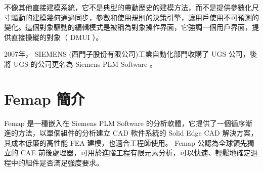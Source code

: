 不像其他直接建模系統，它不是典型的帶動歷史的建模方法，而不是提供參數化尺寸驅動的建模幾何通過同步，參數和使用規則的決策引擎，讓用戶使用不可預測的變化。這個對象驅動的編輯模式是被稱為對象操作界面，它強調一個用戶界面，提供直接操縱的對象（ DMUI ）。

2007年， SIEMENS (西門子股份有限公司)工業自動化部門收購了 UGS 公司，後將 UGS 的公司更名為 Siemens PLM Software 。 \\
\section{Femap 簡介}
 Femap 是一種嵌入在 Siemens PLM Software 的分析軟體，它提供了一個循序漸進的方法，以單個組件的分析建立 CAD 軟件系統的 Solid Edge CAD 解決方案，其成本低廉的高性能 FEA 建模，也適合工程師使用。 Femap 公認為全球領先獨立的 CAE 前後處理器，可用於進階工程有限元素分析，可以快速、輕鬆地確定過程中的組件是否滿足強度要求。 \\


\renewcommand{\baselinestretch}{0.5} %
